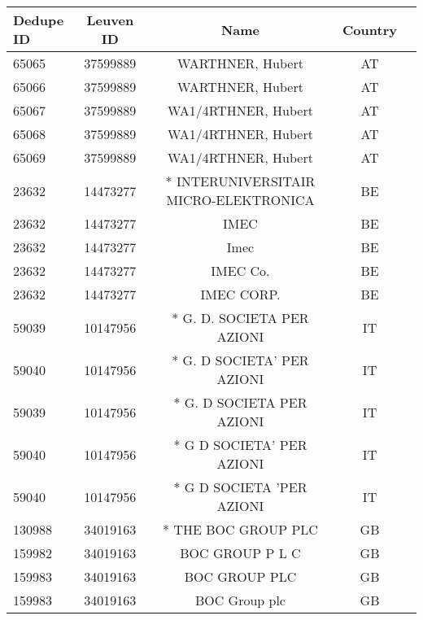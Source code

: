 \begin{longtable}{|l|c|c|c|c|}
\hline
 Dedupe ID &  Leuven ID &                                               Name & Country \\
\hline
     65065 &   37599889 &                                   WARTHNER, Hubert &      AT \\
     65066 &   37599889 &                                   WARTHNER, Hubert &      AT \\
     65067 &   37599889 &                                WA1/4RTHNER, Hubert &      AT \\
     65068 &   37599889 &                                WA1/4RTHNER, Hubert &      AT \\
     65069 &   37599889 &                                WA1/4RTHNER, Hubert &      AT \\
     23632 &   14473277 &              * INTERUNIVERSITAIR MICRO-ELEKTRONICA &      BE \\
     23632 &   14473277 &                                               IMEC &      BE \\
     23632 &   14473277 &                                               Imec &      BE \\
     23632 &   14473277 &                                           IMEC Co. &      BE \\
     23632 &   14473277 &                                         IMEC CORP. &      BE \\
     59039 &   10147956 &                         * G. D. SOCIETA PER AZIONI &      IT \\
     59040 &   10147956 &                         * G. D SOCIETA' PER AZIONI &      IT \\
     59039 &   10147956 &                          * G. D SOCIETA PER AZIONI &      IT \\
     59040 &   10147956 &                          * G D SOCIETA' PER AZIONI &      IT \\
     59040 &   10147956 &                          * G D SOCIETA 'PER AZIONI &      IT \\
    130988 &   34019163 &                                * THE BOC GROUP PLC &      GB \\
    159982 &   34019163 &                                    BOC GROUP P L C &      GB \\
    159983 &   34019163 &                                      BOC GROUP PLC &      GB \\
    159983 &   34019163 &                                      BOC Group plc &      GB \\

\end{longtable}
